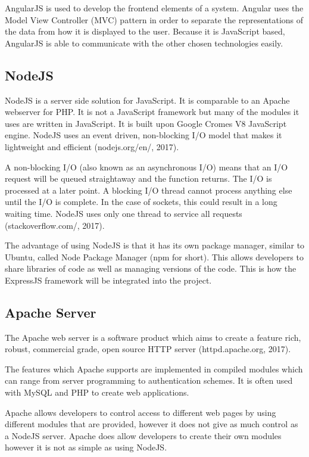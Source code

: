 \documentclass[12pt]{article}
\begin{document}
AngularJS is used to develop the frontend elements of a system. Angular uses the Model View Controller (MVC) pattern in order to separate the representations of the data from how it is displayed to the user. Because it is JavaScript based, AngularJS is able to communicate with the other chosen technologies easily.

\subsection{NodeJS}
NodeJS is a server side solution for JavaScript. It is comparable to an Apache webserver for PHP. It is not a JavaScript framework but many of the modules it uses are written in JavaScript. It is built upon Google Cromes V8 JavaScript engine. NodeJS uses an event driven, non-blocking I/O model that makes it lightweight and efficient (nodejs.org/en/, 2017).

A non-blocking I/O (also known as an asynchronous I/O) means that an I/O request will be queued straightaway and the function returns. The I/O is processed at a later point. A blocking I/O thread cannot process anything else until the I/O is complete. In the case of sockets, this could result in a long waiting time. NodeJS uses only one thread to service all requests (stackoverflow.com/, 2017).

The advantage of using NodeJS is that it has its own package manager, similar to Ubuntu, called Node Package Manager (npm for short). This allows developers to share libraries of code as well as managing versions of the code. This is how the ExpressJS framework will be integrated into the project.

\subsection{Apache Server}
The Apache web server is a software product which aims to create a feature rich, robust, commercial grade, open source HTTP server (httpd.apache.org, 2017). 

The features which Apache supports are implemented in compiled modules which can range from server programming to authentication schemes. It is often used with MySQL and PHP to create web applications.

Apache allows developers to control access to different web pages by using different modules that are provided, however it does not give as much control as a NodeJS server. Apache does allow developers to create their own modules however it is not as simple as using NodeJS.
\end{document}
